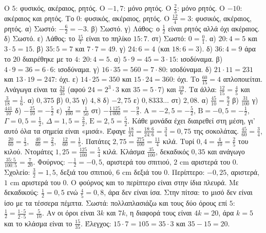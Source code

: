  Ο $5$: φυσικός, ακέραιος, ρητός. Ο $-1{,}7$: μόνο ρητός. Ο $\frac{2}{3}$: μόνο ρητός. Ο $-10$: ακέραιος και ρητός. Το $0$: φυσικός, ακέραιος, ρητός. Ο $\frac{12}{4}=3$: φυσικός, ακέραιος, ρητός.
 α) Σωστό: $-\frac{6}{2}=-3$. β) Σωστό. γ) Λάθος: ο $\frac{1}{2}$ είναι ρητός αλλά όχι ακέραιος. δ) Σωστό. ε) Λάθος: το $\frac{15}{7}$ είναι το πηλίκο $15:7$. στ) Σωστό: $0=\frac{0}{1}$.
 α) $20:4=5$ και $3\cdot5=15$. β) $35:5=7$ και $7\cdot7=49$. γ) $24:6=4$ (και $18:6=3$). δ) $36:4=9$ άρα το $20$ διαιρέθηκε με το $4$: $20:4=5$.
 α) $5\cdot9=45=3\cdot15$: ισοδύναμα. β) $4\cdot9=36=6\cdot6$: ισοδύναμα. γ) $16\cdot35=560=7\cdot80$: ισοδύναμα. δ) $21\cdot11=231$ και $13\cdot19=247$: όχι. ε) $14\cdot25=350$ και $15\cdot24=360$: όχι.
 Το $\frac{60}{15}=4$ απλοποιείται. Ανάγωγα είναι τα $\frac{24}{35}$ (αφού $24=2^3\cdot3$ και $35=5\cdot7$) και $\frac{19}{6}$. Τα άλλα: $\frac{12}{15}=\frac{4}{5}$ και $\frac{3}{18}=\frac{1}{6}$.
 α) $0{,}375$ \quad β) $0{,}35$ \quad γ) $4{,}8$ \quad δ) $-2{,}75$ \quad ε) $0{,}8333\ldots$ \quad στ) $2{,}08$.
 α) $\frac{45}{10}=\frac{9}{2}$ \quad β) $\frac{31}{100}$ \quad γ) $\frac{441}{10}$ \quad δ) $-\frac{25}{10}=-\frac{5}{2}$ \quad ε) $\frac{2}{100}=\frac{1}{50}$ \quad στ) $-\frac{1\,125}{1\,000}=-\frac{9}{8}$.
 $\mathrm{Α}=-2{,}5=-\frac{5}{2}$, $\mathrm{Β}=-0{,}5=-\frac{1}{2}$, $\Gamma=0{,}5=\frac{1}{2}$, $\Delta=1{,}5=\frac{3}{2}$, $\mathrm{Ε}=2{,}5=\frac{5}{2}$. Κάθε μονάδα έχει διαιρεθεί στη μέση, γι' αυτό όλα τα σημεία είναι «μισά».
 Έφαγε $\frac{18}{24}=\frac{18:6}{24:6}=\frac{3}{4}=0{,}75$ της σοκολάτας.
 $\frac{45}{60}=\frac{3}{4}$, \ $\frac{20}{60}=\frac{1}{3}$, \ $\frac{40}{60}=\frac{2}{3}$, \ $\frac{12}{60}=\frac{1}{5}$.
 Πατάτες $2{,}75=\frac{275}{100}=\frac{11}{4}$ κιλά. Τυρί $0{,}4=\frac{4}{10}=\frac{2}{5}$ του κιλού. Ντομάτες $1{,}25=\frac{125}{100}=\frac{5}{4}$ κιλά.
 Κλάσμα $\frac{35}{100}$, δεκαδικός $0{,}35$ και ανάγωγο $\frac{35:5}{100:5}=\frac{7}{20}$.
 Φούρνος: $-\frac{1}{2}=-0{,}5$, αριστερά του σπιτιού, $2$ cm αριστερά του $0$. Σχολείο: $\frac{3}{2}=1{,}5$, δεξιά του σπιτιού, $6$ cm δεξιά του $0$. Περίπτερο: $-0{,}25$, αριστερά, $1$ cm αριστερά του $0$. Ο φούρνος και το περίπτερο είναι στην ίδια πλευρά.
 Με δεκαδικούς: $\frac{1}{2}=0{,}5$ ενώ $\frac{4}{5}=0{,}8$, άρα δεν είναι ίσα. Στην πίτσα: το μισό δεν είναι ίσο με τα τέσσερα πέμπτα. Σωστά: πολλαπλασιάζω και τους δύο όρους επί $5$: $\frac{1}{2}=\frac{1\cdot5}{2\cdot5}=\frac{5}{10}$.
 Αν οι όροι είναι $3k$ και $7k$, η διαφορά τους είναι $4k=20$, άρα $k=5$ και το κλάσμα είναι το $\frac{15}{35}$. Έλεγχος: $15\cdot7=105=35\cdot3$ και $35-15=20$.
